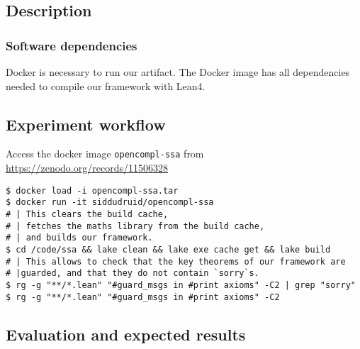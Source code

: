 \documentclass{sigplanconf}
\begin{document}
\subsection{Description}

\subsubsection{Software dependencies}

Docker is necessary to run our artifact.
The Docker image has all dependencies needed to compile our framework with Lean4.



\subsection{Experiment workflow}

Access the docker image \texttt{opencompl-ssa} from
\url{https://zenodo.org/records/11506328}

\begin{verbatim}
$ docker load -i opencompl-ssa.tar
$ docker run -it siddudruid/opencompl-ssa
# | This clears the build cache,
# | fetches the maths library from the build cache,
# | and builds our framework.
$ cd /code/ssa && lake clean && lake exe cache get && lake build
# | This allows to check that the key theorems of our framework are
# |guarded, and that they do not contain `sorry`s.
$ rg -g "**/*.lean" "#guard_msgs in #print axioms" -C2 | grep "sorry"
$ rg -g "**/*.lean" "#guard_msgs in #print axioms" -C2
\end{verbatim}



\subsection{Evaluation and expected results}
\end{document}
